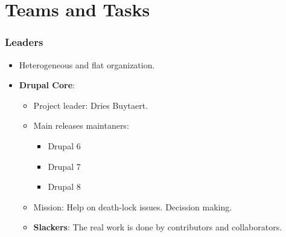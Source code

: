 \section{Teams and Tasks}
\begin{frame}[allowframebreaks]
\frametitle{Leaders}
\begin{itemize}
\item Heterogeneous and flat organization.
\item \textbf{Drupal Core}: 
\begin{itemize}
\item {Project leader}: Dries Buytaert.
\item {Main releases maintaners}: 
\begin{itemize}
\item {Drupal 6}
\item {Drupal 7}
\item {Drupal 8}
\end{itemize}
\item {Mission}: Help on death-lock issues. Decission making.
\item {\textbf{Slackers}}: The real work is done by contributors and collaborators.
\end{itemize}
\end{itemize}
\end{frame}
